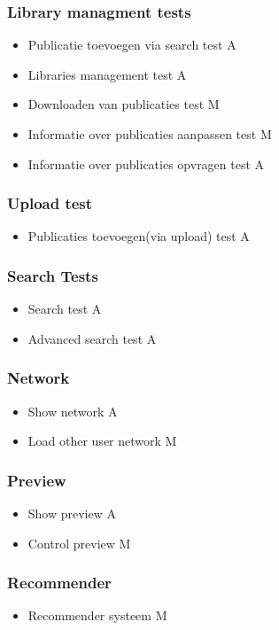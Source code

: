 \documentclass{article}
\begin{document}
\subsubsection{Library managment tests}
\begin{itemize}
  \item Publicatie toevoegen via search test A
  \item Libraries management test A
  \item Downloaden van publicaties test M
  \item Informatie over publicaties aanpassen test M
  \item Informatie over publicaties opvragen test A
\end{itemize}
\subsubsection{Upload test}
\begin{itemize}
  \item Publicaties toevoegen(via upload) test A
\end{itemize}
\subsubsection{Search Tests}
\begin{itemize}
\item Search test A
\item Advanced search test A
\end{itemize}
\subsubsection{Network}
\begin{itemize}
\item Show network A
\item Load other user network M
\end{itemize}
\subsubsection{Preview}
\begin{itemize}
\item Show preview A
\item Control preview M
\end{itemize}
\subsubsection{Recommender}
\begin{itemize}
\item Recommender systeem M
\end{itemize}
\end{document}
